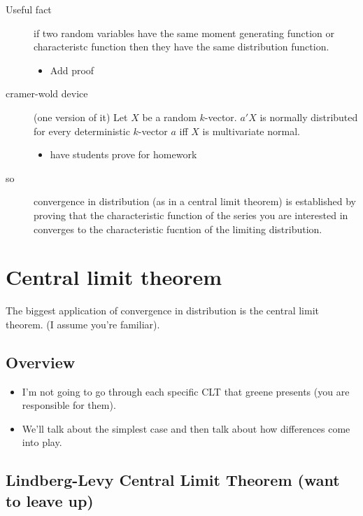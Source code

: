 \begin{itemize}
\begin{itemize}
\begin{description}
\item[Useful fact] if two random variables have the same moment
                          generating function or characteristc function
                          then they have the same distribution
                          function.
\begin{itemize}
\item Add proof
\end{itemize}
\item[cramer-wold device] (one version of it) Let $X$ be a
             random $k$-vector.  $a'X$ is normally distributed for
             every deterministic $k$-vector $a$ iff $X$ is
             multivariate normal.
\begin{itemize}
\item have students prove for homework
\end{itemize}
\item[so] convergence in distribution (as in a central limit
                 theorem) is established by proving that the
                 characteristic function of the series you are
                 interested in converges to the characteristic fucntion
                 of the limiting distribution.
\end{description}
\end{itemize}
\end{itemize}

\section{Central limit theorem}

    The biggest application of convergence in distribution is the
    central limit theorem.  (I assume you're familiar).

\subsection{Overview}

\begin{itemize}
\item I'm not going to go through each specific CLT that greene
       presents (you are responsible for them).
\item We'll talk about the simplest case and then talk about how
       differences come into play.
\end{itemize}

\subsection{Lindberg-Levy Central Limit Theorem (want to leave up)}

